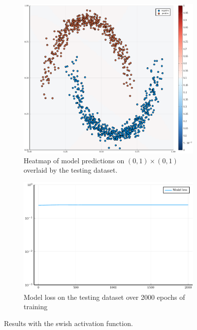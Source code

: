 \begin{figure}
	\centering
	\begin{subfigure}{0.49\textwidth}
		\centering
		\includegraphics[width=\textwidth]{images/swish-heatmap/swish.pdf}
		\caption{Heatmap of model predictions on \( \left( 0, 1 \right) \times \left( 0, 1 \right) \) overlaid by the testing dataset.}
	\end{subfigure}
	\begin{subfigure}{0.49\textwidth}
		\centering
		\includegraphics[width=\textwidth]{images/swish-modelloss/swish.pdf}
		\caption{Model loss on the testing dataset over 2000 epochs of training}
	\end{subfigure}
	\caption{Results with the swish activation function.}\label{swish}
\end{figure}


